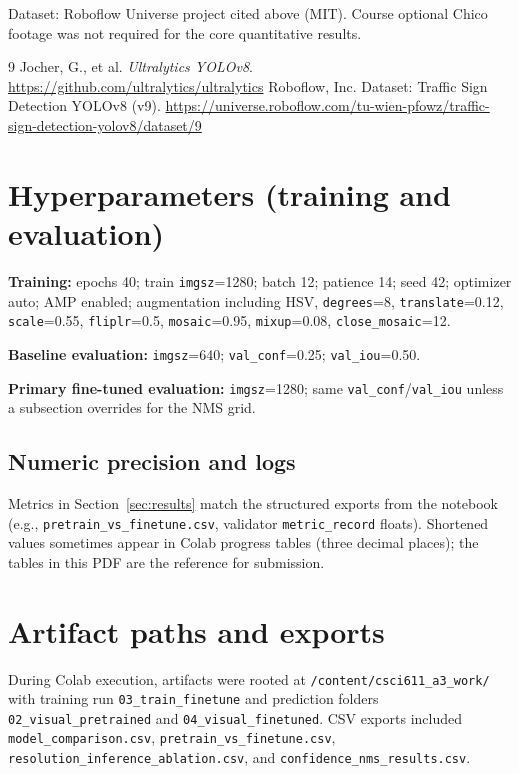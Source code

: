 \documentclass[11pt,a4paper]{article}
\begin{document}
Dataset: Roboflow Universe project cited above (MIT). Course optional Chico footage was not required for the core quantitative results.

\begin{thebibliography}{9}
Jocher, G., et al. \textit{Ultralytics YOLOv8}. \url{https://github.com/ultralytics/ultralytics}
Roboflow, Inc. Dataset: Traffic Sign Detection YOLOv8 (v9). \url{https://universe.roboflow.com/tu-wien-pfowz/traffic-sign-detection-yolov8/dataset/9}
\end{thebibliography}

\appendix

\section{Hyperparameters (training and evaluation)}
\textbf{Training:} epochs \num{40}; train \texttt{imgsz}=\num{1280}; batch \num{12}; patience \num{14}; seed \num{42}; optimizer auto; AMP enabled; augmentation including HSV, \texttt{degrees}=\num{8}, \texttt{translate}=\num{0.12}, \texttt{scale}=\num{0.55}, \texttt{fliplr}=\num{0.5}, \texttt{mosaic}=\num{0.95}, \texttt{mixup}=\num{0.08}, \texttt{close\_mosaic}=\num{12}.

\noindent\textbf{Baseline evaluation:} \texttt{imgsz}=\num{640}; \texttt{val\_conf}=\num{0.25}; \texttt{val\_iou}=\num{0.50}.

\noindent\textbf{Primary fine-tuned evaluation:} \texttt{imgsz}=\num{1280}; same \texttt{val\_conf}/\texttt{val\_iou} unless a subsection overrides for the NMS grid.

\subsection*{Numeric precision and logs}
Metrics in Section~\ref{sec:results} match the structured exports from the notebook (e.g., \texttt{pretrain\_vs\_finetune.csv}, validator \texttt{metric\_record} floats). Shortened values sometimes appear in Colab progress tables (three decimal places); the tables in this PDF are the reference for submission.

\section{Artifact paths and exports}
During Colab execution, artifacts were rooted at \texttt{/content/csci611\_a3\_work/} with training run \texttt{03\_train\_finetune} and prediction folders \texttt{02\_visual\_pretrained} and \texttt{04\_visual\_finetuned}. CSV exports included \texttt{model\_comparison.csv}, \texttt{pretrain\_vs\_finetune.csv}, \texttt{resolution\_inference\_ablation.csv}, and \texttt{confidence\_nms\_results.csv}.
\end{document}
